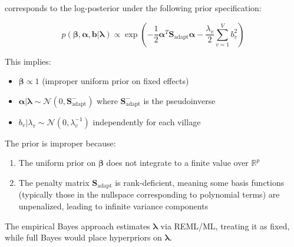 \documentclass[11pt]{article}
\begin{document}
corresponds to the log-posterior under the following prior specification:

\begin{equation}
p(\boldsymbol{\beta}, \boldsymbol{\alpha}, \mathbf{b} | \boldsymbol{\lambda}) \propto \exp\left(-\frac{1}{2}\boldsymbol{\alpha}^T \mathbf{S}_{\text{adapt}} \boldsymbol{\alpha} - \frac{\lambda_v}{2} \sum_{v=1}^{V} b_v^2\right)
\end{equation}

This implies:
\begin{itemize}
    \item $\boldsymbol{\beta} \propto 1$ (improper uniform prior on fixed effects)
    \item $\boldsymbol{\alpha} | \boldsymbol{\lambda} \sim \mathcal{N}(0, \mathbf{S}_{\text{adapt}}^{-})$ where $\mathbf{S}_{\text{adapt}}^{-}$ is the pseudoinverse
    \item $b_v | \lambda_v \sim \mathcal{N}(0, \lambda_v^{-1})$ independently for each village
\end{itemize}

The prior is improper because:
\begin{enumerate}
    \item The uniform prior on $\boldsymbol{\beta}$ does not integrate to a finite value over $\mathbb{R}^p$
    \item The penalty matrix $\mathbf{S}_{\text{adapt}}$ is rank-deficient, meaning some basis functions (typically those in the nullspace corresponding to polynomial terms) are unpenalized, leading to infinite variance components
\end{enumerate}

The empirical Bayes approach estimates $\boldsymbol{\lambda}$ via REML/ML, treating it as fixed, while full Bayes would place hyperpriors on $\boldsymbol{\lambda}$.
\end{document}
